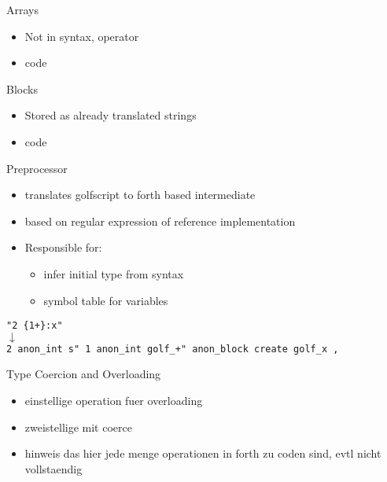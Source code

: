 \documentclass{beamer}
\begin{document}
\begin{frame}
    Arrays

    \begin{itemize}
        \item Not in syntax, operator
        \item code
    \end{itemize}
\end{frame}

\begin{frame}
    Blocks

    \begin{itemize}
        \item Stored as already translated strings
        \item code
    \end{itemize}
\end{frame}


\begin{frame}
    Preprocessor
    \begin{itemize}
        \item translates golfscript to forth based intermediate 
        \item based on regular expression of reference implementation 
        \item Responsible for:
        \begin{itemize}
            \item infer initial type from syntax
            \item symbol table for variables
        \end{itemize}
    \end{itemize}


    \vspace{0.5cm}

\begin{center}
    \small{    
\texttt{"2 \{1+\}:x"}  \\
$\downarrow$ \\
\texttt{2 anon\_int s" 1 anon\_int golf\_+" anon\_block create golf\_x , }
}
\end{center}

\end{frame}





\begin{frame}
    Type Coercion and Overloading

    \begin{itemize}
        \item einstellige operation fuer overloading
        \item zweistellige mit coerce
        \item hinweis das hier jede menge operationen in forth zu coden sind, 
              evtl nicht vollstaendig
    \end{itemize}
\end{frame}
\end{document}
